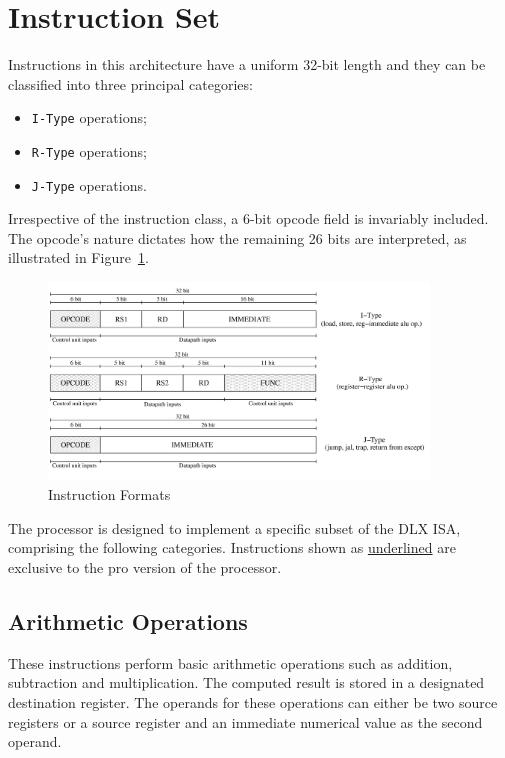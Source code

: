 \section{Instruction Set}
\label{sec:instruction_set}
Instructions in this architecture have a uniform 32-bit length and they can be classified into three principal categories:
\begin{itemize}%
    \item \texttt{I-Type} operations;
    \item \texttt{R-Type} operations;
    \item \texttt{J-Type} operations.
\end{itemize}

Irrespective of the instruction class, a 6-bit opcode field is invariably included. The opcode's nature dictates how the remaining 26 bits are interpreted, as illustrated in Figure~\ref{fig:instruction_format}. \\

\begin{figure}[!htbp]
    \centering
    \includegraphics[width=0.9\textwidth]{source/figures/instruction_formats.png}
    \caption{Instruction Formats}
    \label{fig:instruction_format}
\end{figure}

The processor is designed to implement a specific subset of the DLX ISA, comprising the following categories. Instructions shown as \underline{underlined} are exclusive to the pro version of the processor.

\subsection{Arithmetic Operations}
These instructions perform basic arithmetic operations such as addition, subtraction and multiplication. The computed result is stored in a designated destination register. The operands for these operations can either be two source registers or a source register and an immediate numerical value as the second operand.

